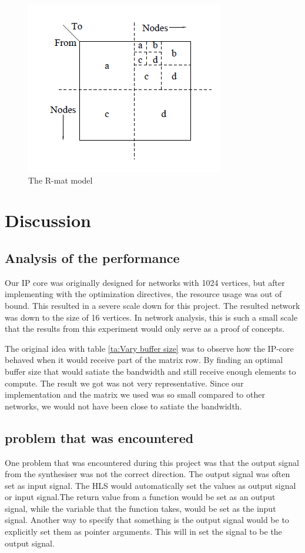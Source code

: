 \begin{figure}
\includegraphics{Figures/Rmat}
\caption{The R-mat model \cite{Rmat2004}}
\label{fig:Rmat}
\end{figure}



\section{Discussion}
\subsection*{Analysis of the performance}
Our IP core was originally designed for networks with 1024 vertices, but after implementing with the optimization directives, the resource usage was out of bound. This resulted in a severe scale down for this project. The resulted network was down to the size of 16 vertices. In network analysis, this is such a small scale that the results from this experiment would only serve as a proof of concepts. 

The original idea with table \ref{ta:Vary buffer size} was to observe how the IP-core behaved when it would receive part of the matrix row. By finding an optimal buffer size that would satiate the bandwidth and still receive enough elements to compute. The result we got was not very representative. Since our implementation and the matrix we used was so small compared to other networks, we would not have been close to satiate the bandwidth.
 
\subsection*{problem that was encountered}
One problem that was encountered during this project was that the output signal from the synthesiser was not the correct direction. The output signal was often set as input signal. The HLS would automatically set the values as output signal or input signal.The return value from a function would be set as an output signal, while the variable that the function takes, would be set as the input signal. Another way to specify that something is the output signal would be to explicitly set them as pointer arguments. This will in set the signal to be the output signal.

